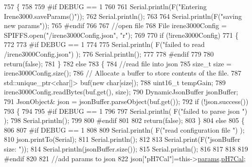 \begin{DoxyCode}
757 \{
758 
759 \textcolor{preprocessor}{#if DEBUG == 1}
760         
761     Serial.println(F(\textcolor{stringliteral}{"Entering Irene3000.saveParams()"}));
762     Serial.println();
763     
764     Serial.println(F(\textcolor{stringliteral}{"saving new params"}));
765 \textcolor{preprocessor}{#endif}
766     
767     \textcolor{comment}{//open file}
768     File irene3000Config = SPIFFS.open(\textcolor{stringliteral}{"/irene3000Config.json"}, \textcolor{stringliteral}{"r"});
769 
770     \textcolor{keywordflow}{if} (!irene3000Config) 
771     \{
772     
773 \textcolor{preprocessor}{    #if DEBUG == 1 }
774 
775         Serial.println( F(\textcolor{stringliteral}{"failed to read /irene3000Config.json"}) );
776         Serial.println();
777     
778 \textcolor{preprocessor}{    #endif}
779 
780         \textcolor{keywordflow}{return}(\textcolor{keyword}{false});
781     \}
782     \textcolor{keywordflow}{else}
783     \{
784         \textcolor{comment}{//read file into json}
785         \textcolor{keywordtype}{size\_t} size = irene3000Config.size();
786         \textcolor{comment}{// Allocate a buffer to store contents of the file.}
787         std::unique\_ptr<char[]> buf(\textcolor{keyword}{new} \textcolor{keywordtype}{char}[size]);
788             uint16\_t tempGain;
789         irene3000Config.readBytes(buf.get(), size);
790         DynamicJsonBuffer jsonBuffer;
791         JsonObject& json = jsonBuffer.parseObject(buf.get());
792         \textcolor{keywordflow}{if} (!json.success()) 
793         \{
794         
795 \textcolor{preprocessor}{        #if DEBUG == 1 }
796 
797             Serial.println( F(\textcolor{stringliteral}{"failed to parse json "}) );
798             Serial.println();
799         
800 \textcolor{preprocessor}{        #endif}
801             
802             \textcolor{keywordflow}{return}(\textcolor{keyword}{false});
803         \} 
804         \textcolor{keywordflow}{else}
805         \{
806         
807 \textcolor{preprocessor}{        #if DEBUG == 1 }
808     
809             Serial.println( F(\textcolor{stringliteral}{"read configuration file "}) );
810             json.printTo(Serial);
811             Serial.println();
812 
813             Serial.print(F(\textcolor{stringliteral}{"jsonBuffer size: "}));
814             Serial.println(jsonBuffer.size());
815             Serial.println();
816 
817         
818 
819 \textcolor{preprocessor}{        #endif          }
820     
821             \textcolor{comment}{//add params to json}
822             json[\textcolor{stringliteral}{"pH7Cal"}]=this->\hyperlink{class_irene3000_a136585a5ee7f9ac6ab52175fa153f8e3}{params}.\hyperlink{struct_irene3000_1_1parameters___t_a21265466a570d84bff914f26d2f7a03e}{pH7Cal};

\end{DoxyCode}
